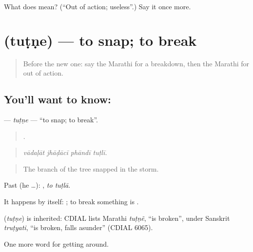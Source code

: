 \begin{tcolorbox}[breakable,colback=teal!4,colframe=teal!35!black,title={Before you move on}]
What does  mean? (\textquotedblleft{}Out of action; useless\textquotedblright{}.) Say it once more.
\end{tcolorbox}
\section[\texorpdfstring{\mr{तुटणे} (tuṭṇe)}{तुटणे (tuṭṇe)}]{ (tuṭṇe) — to snap; to break}

\label{lesson:MR-C431-tutne}



\begin{quote}
Before the new one: say the Marathi for a breakdown, then the Marathi for out of action.
\end{quote}

\subsection*{You'll want to know: }
\textbf{} — \emph{tuṭṇe} — \textquotedblleft{}to snap; to break\textquotedblright{}.

\begin{quote}
   .
\end{quote}

\begin{quote}
\emph{vādaḷāt jhāḍācī phāndī tuṭlī.}
\end{quote}

\begin{quote}
The branch of the tree snapped in the storm.
\end{quote}

Past (he …):  , \emph{to tuṭlā}.

It happens by itself:  ; to break something is .

\begin{cousinweb}
\textbf{} (\emph{tuṭṇe}) is inherited: CDIAL lists Marathi \emph{tuṭṇẽ}, \textquotedblleft{}is broken\textquotedblright{}, under Sanskrit \emph{truṭyati}, \textquotedblleft{}is broken, falls asunder\textquotedblright{} (CDIAL 6065).
\end{cousinweb}

\begin{grammarlens}[title={What you've built}]
One more word for getting around.
\end{grammarlens}

